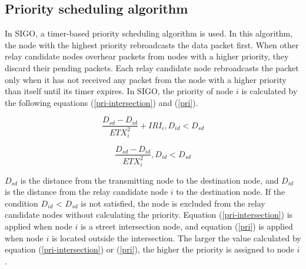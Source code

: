 \documentclass[conference]{IEEEtran}
\begin{document}


\subsection{Priority scheduling algorithm}
\label{priority}
In SIGO, a timer-based priority scheduling algorithm is used. 
In this algorithm, the node with the highest priority rebroadcasts the data packet first. 
When other relay candidate nodes overhear packets from nodes with a higher priority, they discard their pending packets. Each relay candidate node rebroadcasts the packet only when it has not received any packet from the node with a higher priority than itself until its timer expires.
In SIGO, the priority of node $i$ is calculated by the following equations (\ref{pri-intersection}) and (\ref{pri}).


\begin{equation}
\label{pri-intersection}
\frac{D_{sd} - D_{id}}{ETX_{i}^{2}} + IRI_i,  D_{id} < D_{sd}
\end{equation}

\begin{equation}
\label{pri}
\frac{D_{sd} - D_{id}}{ETX_{i}^{2}} ,   D_{id} < D_{sd}
\end{equation}

$D_{sd}$ is the distance from the transmitting node to the destination node, and $D_{id}$ is the distance from the relay candidate node $i$ to the destination node. If the condition $D_{id}$ < $D_{sd}$ is not satisfied, the node is excluded from the relay candidate nodes without calculating the priority. 
Equation (\ref{pri-intersection}) is applied when node $i$ is a street intersection node, and equation (\ref{pri}) is applied when node $i$ is located outside the intersection. 
The larger the value calculated by equation (\ref{pri-intersection}) or (\ref{pri}), the higher the priority is assigned to node $i$. 
\end{document}
